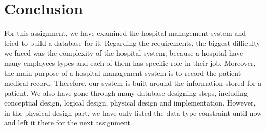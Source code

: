 \documentclass[a4paper]{article}
\numberwithin{equation}{section}
\begin{document}
\newpage

\section{Conclusion}
For this assignment, we have examined the hospital management system and tried to build a database for it. Regarding the requirements, the biggest difficulty we faced was the complexity of the hospital system, because a hospital have many employees types and each of them has specific role in their job. Moreover, the main purpose of a hospital management system is to record the patient medical record. Therefore, our system is built around the information stored for a patient. We also have gone through many database designing steps, including conceptual design, logical design, physical design and implementation. However, in the physical design part, we have only listed the data type constraint until now and left it there for the next assignment.
\end{document}
